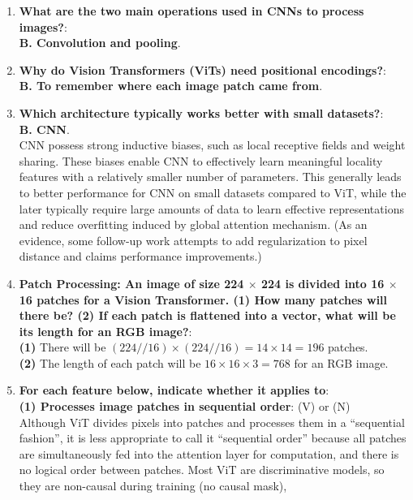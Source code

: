 \documentclass[11pt, a4paper, oneside]{memoir}
\begin{document}
\begin{enumerate}[itemsep=1em]
    \item \textbf{What are the two main operations used in CNNs to process images?}: \\
        \textbf{B. Convolution and pooling}. 
    \item \textbf{Why do Vision Transformers (ViTs) need positional encodings?}: \\
        \textbf{B. To remember where each image patch came from}. 
    \item \textbf{Which architecture typically works better with small datasets?}: \\
        \textbf{B. CNN}. \\
        CNN possess strong inductive biases, such as local receptive fields and weight sharing.
        These biases enable CNN to effectively learn meaningful locality features with a relatively smaller number of parameters.
        This generally leads to better performance for CNN on small datasets compared to ViT,
        while the later typically require large amounts of data to learn effective representations and reduce overfitting
        induced by global attention mechanism. (As an evidence, some follow-up work attempts to add regularization to pixel distance
        and claims performance improvements.)
    \item \textbf{Patch Processing: An image of size 224 $\times$ 224 is divided into 16 $\times$ 16 patches for a Vision Transformer.
    \textbf{(1)} How many patches will there be? \textbf{(2)} If each patch is flattened into a vector, what will be its length
    for an RGB image?}: \\
        \textbf{(1)} There will be $(224 // 16) \times (224 // 16) = 14 \times 14 = 196$ patches. \\
        \textbf{(2)} The length of each patch will be $16 \times 16 \times 3 = 768$ for an RGB image.
    \item \textbf{For each feature below, indicate whether it applies to}: \\
        \textbf{(1) Processes image patches in sequential order}: (V) or (N) \\
            Although ViT divides pixels into patches and processes them in a ``sequential fashion'',
            it is less appropriate to call it ``sequential order'' because all patches are simultaneously fed into the attention layer for computation,
            and there is no logical order between patches. Most ViT are discriminative models, so they are non-causal during training (no causal mask),

\end{enumerate}
\end{document}

